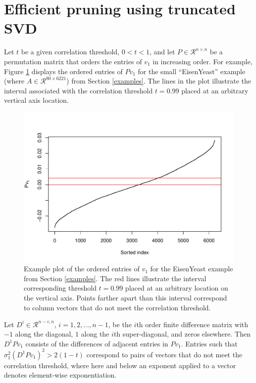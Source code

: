 \documentclass[article]{jss}
\numberwithin{algorithmctr}{section}
\begin{document}
\section{Efficient pruning using truncated SVD}

Let $t$ be a given correlation threshold, $0<t<1$, and let
$P\in\mathcal{R}^{n\times n}$ be a permutation matrix that orders the entries
of $v_1$ in increasing order.  For example, Figure \ref{fig1} displays the
ordered entries of $Pv_1$ for the small ``EisenYeast'' example (where
$A\in\mathcal{R}^{80 \times 6221}$) from Section \ref{examples}.  The lines in
the plot illustrate the interval associated with the correlation threshold
$t=0.99$ placed at an arbitrary vertical axis location.

\begin{figure}[!ht]
\begin{center}
\includegraphics{draft-001}
\caption{
Example plot of the ordered entries of $v_1$ for the EisenYeast example from
Section \ref{examples}. The red lines illustrate the interval corresponding
threshold $t=0.99$ placed at an arbitrary location on the vertical axis. Points
farther apart than this interval correspond to column vectors that do not meet
the correlation threshold.
\label{fig1}
}
\end{center}
\end{figure}

Let $D^i\in\mathcal{R}^{n-i, n}$, $i=1,2,\ldots,n-1$, be the $i$th order finite
difference matrix with $-1$ along the diagonal, $1$ along the $i$th
super-diagonal, and zeros elsewhere.  Then $D^1P v_1$ consists of the
differences of adjacent entries in $P v_1$.  Entries such that $\sigma_1^2 (D^1
P v_1)^2 > 2(1-t)$ correspond to pairs of vectors that do not meet the
correlation threshold, where here and below an exponent applied to a vector
denotes element-wise exponentiation.
\end{document}
